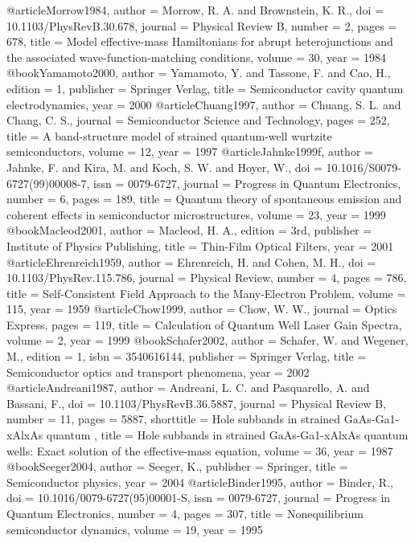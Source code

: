 @article{Morrow1984,
author = {Morrow, R. A. and Brownstein, K. R.},
doi = {10.1103/PhysRevB.30.678},
journal = {Physical Review B},
number = {2},
pages = {678},
title = {{Model effective-mass Hamiltonians for abrupt heterojunctions and the associated wave-function-matching conditions}},
volume = {30},
year = {1984}
}
@book{Yamamoto2000,
author = {Yamamoto, Y. and Tassone, F. and Cao, H.},
edition = {1},
publisher = {Springer Verlag},
title = {{Semiconductor cavity quantum electrodynamics}},
year = {2000}
}
@article{Chuang1997,
author = {Chuang, S. L. and Chang, C. S.},
journal = {Semiconductor Science and Technology},
pages = {252},
title = {{A band-structure model of strained quantum-well wurtzite semiconductors}},
volume = {12},
year = {1997}
}
@article{Jahnke1999f,
author = {Jahnke, F. and Kira, M. and Koch, S. W. and Hoyer, W.},
doi = {10.1016/S0079-6727(99)00008-7},
issn = {0079-6727},
journal = {Progress in Quantum Electronics},
number = {6},
pages = {189},
title = {{Quantum theory of spontaneous emission and coherent effects in semiconductor microstructures}},
volume = {23},
year = {1999}
}
@book{Macleod2001,
author = {Macleod, H. A.},
edition = {3rd},
publisher = {Institute of Physics Publishing},
title = {{Thin-Film Optical Filters}},
year = {2001}
}
@article{Ehrenreich1959,
author = {Ehrenreich, H. and Cohen, M. H.},
doi = {10.1103/PhysRev.115.786},
journal = {Physical Review},
number = {4},
pages = {786},
title = {{Self-Consistent Field Approach to the Many-Electron Problem}},
volume = {115},
year = {1959}
}
@article{Chow1999,
author = {Chow, W. W.},
journal = {Optics Express},
pages = {119},
title = {{Calculation of Quantum Well Laser Gain Spectra}},
volume = {2},
year = {1999}
}
@book{Schafer2002,
author = {Schafer, W. and Wegener, M.},
edition = {1},
isbn = {3540616144},
publisher = {Springer Verlag},
title = {{Semiconductor optics and transport phenomena}},
year = {2002}
}
@article{Andreani1987,
author = {Andreani, L. C. and Pasquarello, A. and Bassani, F.},
doi = {10.1103/PhysRevB.36.5887},
journal = {Physical Review B},
number = {11},
pages = {5887},
shorttitle = {Hole subbands in strained GaAs-Ga1-xAlxAs quantum },
title = {{Hole subbands in strained GaAs-Ga1-xAlxAs quantum wells: Exact solution of the effective-mass equation}},
volume = {36},
year = {1987}
}
@book{Seeger2004,
author = {Seeger, K.},
publisher = {Springer},
title = {{Semiconductor physics}},
year = {2004}
}
@article{Binder1995,
author = {Binder, R.},
doi = {10.1016/0079-6727(95)00001-S},
issn = {0079-6727},
journal = {Progress in Quantum Electronics},
number = {4},
pages = {307},
title = {{Nonequilibrium semiconductor dynamics}},
volume = {19},
year = {1995}
}
